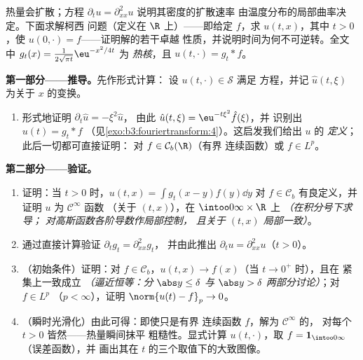 \begin{problem}[{周末问题——$\partial_tu =
\partial^2_{xx}u$，从头到尾求解}]
\label{pb:b3:fouriertransform:1}
热量会扩散；方程 $\partial_tu = \partial_{xx}^2u$
说明其密度的扩散速率
由温度分布的局部曲率决定。下面求解柯西
问题（定义在 $\R$ 上）——即给定 $f$，求 $u(t, x)$，其中 $t > 0$，使
$u(0, \cdot) = f$——证明解的若干卓越
性质，并说明时间为何不可逆转。全文中
$g_t(x) = \frac1{2\sqrt{\pi t}}\eu^{-x^2/4t}$ 为
\emph{热核}，且 $u(t, \cdot) = g_t *
f$。

\medskip
\noindent\textbf{第一部分——推导。}先作形式计算：
设 $u(t, \cdot) \in \mathcal S$ 满足
方程，并记 $\hat u(t, \xi)$ 为关于
$x$ 的变换。
\begin{enumerate}
  \item 形式地证明 $\partial_t\hat u = -\xi^2\hat u$，
        由此 $\hat u(t,\xi) = \eu^{-t\xi^2}\hat f(\xi)$，并
        识别出 $u(t) = g_t * f$
        （见\cref{exo:b3:fouriertransform:4}）。这启发我们给出 $u$ 的
        \emph{定义}；此后一切都可直接证明：
        对 $f \in \mathcal C_b(\R)$（有界
        连续函数）或 $f \in L^p$。
\end{enumerate}

\medskip
\noindent\textbf{第二部分——验证。}
\begin{enumerate}[resume]
  \item 证明：当 $t > 0$ 时，$u(t, x) = \int
        g_t(x-y)f(y)\dd y$ 对 $f \in \mathcal
        C_b$ 有良定义，并证明 $u$ 为 $\mathcal C^\infty$ 函数
        （关于 $(t, x)$），在 $\intoo0\infty\times\R$ 上 \emph{（在积分号下求导；
        对高斯函数各阶导数作局部控制，
        且关于 $(t,x)$ 局部一致）}。
  \item 通过直接计算验证 $\partial_tg_t = \partial^2_{xx}g_t$，
        并由此推出 $\partial_tu =
        \partial^2_{xx}u$（$t > 0$）。
  \item （初始条件）证明：对 $f \in \mathcal
        C_b$，$u(t, x) \to f(x)$（当 $t \to 0^+$ 时），且在
        紧集上一致成立 \emph{（逼近恒等：分 $\abs y
        \leq \delta$ 与 $\abs y > \delta$ 两部分讨论）}；对 $f \in L^p$
        （$p < \infty$），证明 $\norm{u(t) - f}_p \to 0$。
  \item （瞬时光滑化）由此可得：即使只是有界
        连续函数 $f$，解为 $\mathcal C^\infty$ 的，
        对每个 $t > 0$ 皆然——热量瞬间抹平
        粗糙性。显式计算 $u(t, \cdot)$，取 $f =
        \mathbf 1_{\intoo0\infty}$（误差函数），并
        画出其在 $t$ 的三个取值下的大致图像。
\end{enumerate}


\end{problem}
